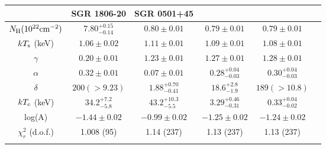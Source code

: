 \documentclass[]{raa}
\begin{document}
\begin{table}
\begin{tabular}{cccccc}
  \hline\noalign{\smallskip}
 & SGR 1806-20 & SGR 0501+45 & &  \\
  \hline\noalign{\smallskip}
$N_{\rm H} (10^{22} {\rm cm}^{-2})$ & $7.80_{-0.14}^{+0.15}$ & $0.80 \pm 0.01$ & $0.79 \pm 0.01 $ & $0.79 \pm 0.01 $ \\
$kT_{\rm s}$ (keV) & $1.06 \pm 0.02$ & $1.11 \pm 0.01$ & $1.09 \pm 0.01$ & $1.08 \pm 0.01$  \\
$\gamma$ & $0.20 \pm 0.01$ & $1.23 \pm 0.01$ & $1.27 \pm 0.01$ & $1.28 \pm 0.01$  \\
$\alpha$ & $0.32 \pm 0.01$ & $0.07 \pm 0.01$ & $0.28_{-0.03}^{+0.04}$ & $0.30_{-0.03}^{+0.04}$  \\ 
$\delta$ & $200 (>9.23)$ & $1.88_{-0.41}^{+0.70}$ & $18.6_{-1.9}^{+2.8}$ & $189 (>10.8)$  \\
$kT_{\rm e}$ (keV) & $34.2_{-5.8}^{+7.2}$ & $43.2_{-5.5}^{+10.3}$ & $3.29_{-0.31}^{+0.46}$ & $0.33_{-0.02}^{+0.04}$  \\
log(A) & $-1.44 \pm 0.02$ & $-0.99 \pm 0.02$ & $-1.25 \pm 0.02$ & $-1.24 \pm 0.02$  \\
$\chi_r^2$ (d.o.f.) & 1.008 (95) & 1.14 (237)  & 1.13 (237) & 1.13 (237)  \\
  \noalign{\smallskip}\hline

\end{tabular}
\ec
\end{table}

%
%
%
\end{document}
